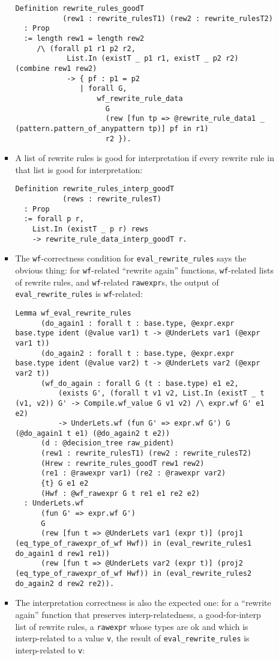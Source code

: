\documentclass[
]{article}
\begin{document}
\begin{itemize}
\begin{itemize}
\begin{itemize}
\begin{verbatim}
Definition rewrite_rules_goodT
           (rew1 : rewrite_rulesT1) (rew2 : rewrite_rulesT2)
  : Prop
  := length rew1 = length rew2
     /\ (forall p1 r1 p2 r2,
            List.In (existT _ p1 r1, existT _ p2 r2) (combine rew1 rew2)
            -> { pf : p1 = p2
               | forall G,
                   wf_rewrite_rule_data
                     G
                     (rew [fun tp => @rewrite_rule_data1 _ (pattern.pattern_of_anypattern tp)] pf in r1)
                     r2 }).
\end{verbatim}
    \item
      A list of rewrite rules is good for interpretation if every
      rewrite rule in that list is good for interpretation:

\begin{verbatim}
Definition rewrite_rules_interp_goodT
           (rews : rewrite_rulesT)
  : Prop
  := forall p r,
    List.In (existT _ p r) rews
    -> rewrite_rule_data_interp_goodT r.
\end{verbatim}
    \item
      The \texttt{wf}-correctness condition for
      \texttt{eval\_rewrite\_rules} says the obvious thing: for
      \texttt{wf}-related ``rewrite again'' functions,
      \texttt{wf}-related lists of rewrite rules, and
      \texttt{wf}-related \texttt{rawexpr}s, the output of
      \texttt{eval\_rewrite\_rules} is \texttt{wf}-related:

\begin{verbatim}
Lemma wf_eval_rewrite_rules
      (do_again1 : forall t : base.type, @expr.expr base.type ident (@value var1) t -> @UnderLets var1 (@expr var1 t))
      (do_again2 : forall t : base.type, @expr.expr base.type ident (@value var2) t -> @UnderLets var2 (@expr var2 t))
      (wf_do_again : forall G (t : base.type) e1 e2,
          (exists G', (forall t v1 v2, List.In (existT _ t (v1, v2)) G' -> Compile.wf_value G v1 v2) /\ expr.wf G' e1 e2)
          -> UnderLets.wf (fun G' => expr.wf G') G (@do_again1 t e1) (@do_again2 t e2))
      (d : @decision_tree raw_pident)
      (rew1 : rewrite_rulesT1) (rew2 : rewrite_rulesT2)
      (Hrew : rewrite_rules_goodT rew1 rew2)
      (re1 : @rawexpr var1) (re2 : @rawexpr var2)
      {t} G e1 e2
      (Hwf : @wf_rawexpr G t re1 e1 re2 e2)
  : UnderLets.wf
      (fun G' => expr.wf G')
      G
      (rew [fun t => @UnderLets var1 (expr t)] (proj1 (eq_type_of_rawexpr_of_wf Hwf)) in (eval_rewrite_rules1 do_again1 d rew1 re1))
      (rew [fun t => @UnderLets var2 (expr t)] (proj2 (eq_type_of_rawexpr_of_wf Hwf)) in (eval_rewrite_rules2 do_again2 d rew2 re2)).
\end{verbatim}
    \item
      The interpretation correctness is also the expected one: for a
      ``rewrite again'' function that preserves interp-relatedness, a
      good-for-interp list of rewrite rules, a \texttt{rawexpr} whose
      types are ok and which is interp-related to a value \texttt{v},
      the result of \texttt{eval\_rewrite\_rules} is interp-related to
      \texttt{v}:


\end{itemize}
\end{itemize}
\end{itemize}
\end{document}
